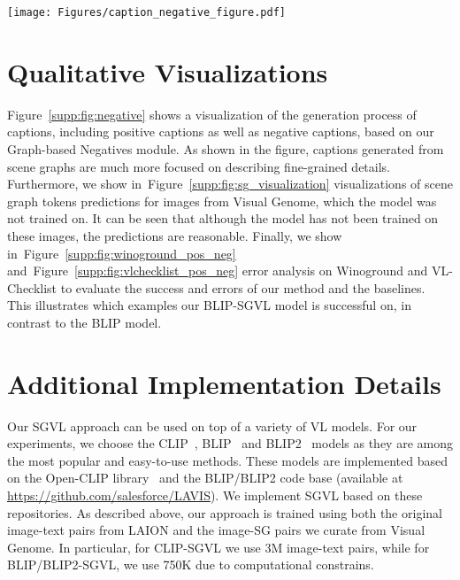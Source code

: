 \documentclass[11pt]{article}
\newcommand{\figgref}[1]{Figure~\ref{#1}}
\newcommand{\smodel}{SGVL}
\begin{document}
\begin{figure*}
\centering
    \texttt{[image: Figures/caption\_negative\_figure.pdf]}
    \vspace{-3em}
    \label{supp:fig:negative}
\end{figure*}

\section{Qualitative Visualizations}

\label{supp:qual}




\figgref{supp:fig:negative} shows a visualization of the generation process of captions, including positive captions as well as negative captions, based on our Graph-based Negatives module. As shown in the figure, captions generated from scene graphs are much more focused on describing fine-grained details. Furthermore, we show in~\figgref{supp:fig:sg_visualization} visualizations of scene graph tokens predictions for images from Visual Genome, which the model was not trained on. It can be seen that although the model has not been trained on these images, the predictions are reasonable. Finally, we show in~\figgref{supp:fig:winoground_pos_neg} and~\figgref{supp:fig:vlchecklist_pos_neg} error analysis on Winoground and VL-Checklist to evaluate the success and errors of our method and the baselines. This illustrates which examples our BLIP-SGVL model is successful on, in contrast to the BLIP model.

















\section{Additional Implementation Details}
\label{supp:impl}

Our {\smodel} approach can be used on top of a variety of VL models. For our experiments, we choose the CLIP~\cite{radford2021learning}, BLIP~\cite{blip} and BLIP2~\cite{li2023blip2} models as they are among the most popular and easy-to-use methods. These models are implemented based on the Open-CLIP library~\cite{openclip} and the BLIP/BLIP2 code base (available at \url{https://github.com/salesforce/LAVIS}). We implement {\smodel} based on these repositories. As described above, our approach is trained using both the original image-text pairs from LAION and the image-SG pairs we curate from Visual Genome. In particular, for CLIP-SGVL we use 3M image-text pairs, while for BLIP/BLIP2-SGVL, we use 750K due to computational constrains. 
\end{document}
